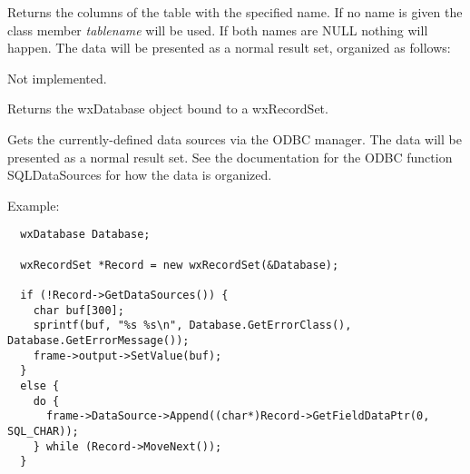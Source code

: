 
Returns the columns of the table with the specified name. If no name is
given the class member {\it tablename} will be used. If both names are NULL
nothing will happen. The data will be presented as a normal result set, organized
as follows:

\begin{twocollist}\itemsep=0pt
\end{twocollist}



Not implemented.



Returns the wxDatabase object bound to a wxRecordSet.

\label{wxrecordsetgetdatasources}


Gets the currently-defined data sources via the ODBC manager. The data will be presented
as a normal result set. See the documentation for the ODBC function SQLDataSources for how the data
is organized.

Example:
  
\begin{verbatim}
  wxDatabase Database;

  wxRecordSet *Record = new wxRecordSet(&Database);

  if (!Record->GetDataSources()) {
    char buf[300];
    sprintf(buf, "%s %s\n", Database.GetErrorClass(), Database.GetErrorMessage());
    frame->output->SetValue(buf);
  }
  else {
    do {
      frame->DataSource->Append((char*)Record->GetFieldDataPtr(0, SQL_CHAR));
    } while (Record->MoveNext());
  }
\end{verbatim}


